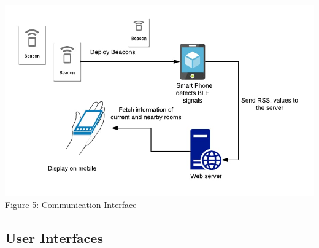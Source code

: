 \documentclass{article}
\begin{document}
\begin{center}

\includegraphics[scale=0.3]{ci}
\\Figure 5: Communication Interface
\end{center}

\subsection{User Interfaces}
\end{document}
